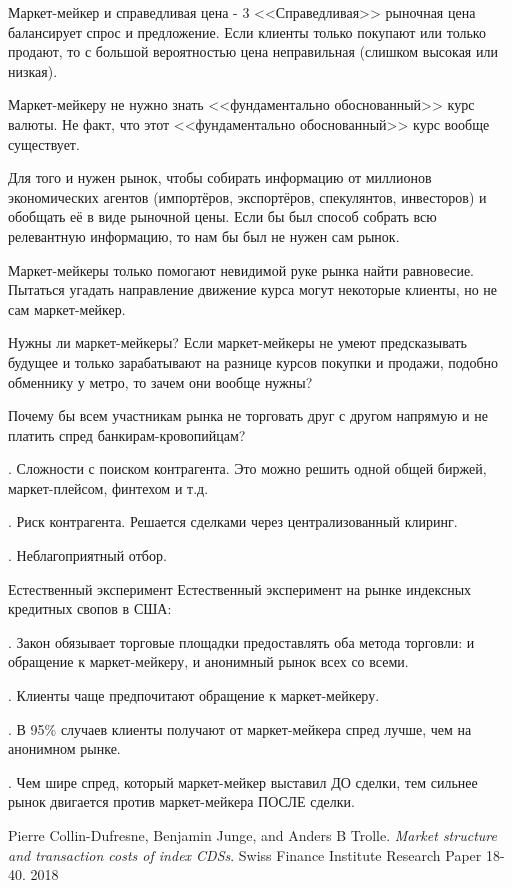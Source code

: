 \documentclass{beamer}
\begin{document}
\begin{frame}{Маркет-мейкер и справедливая цена - 3}
\justify
<<Справедливая>> рыночная цена балансирует спрос и предложение.
Если клиенты только покупают или только продают, то с большой вероятностью цена 
неправильная (слишком высокая или низкая).

\justify
Маркет-мейкеру не нужно знать <<фундаментально обоснованный>> курс валюты. Не факт, что этот <<фундаментально обоснованный>> курс вообще существует.

\justify
Для того и нужен рынок, чтобы собирать информацию от миллионов экономических 
агентов (импортёров, экспортёров, спекулянтов, инвесторов) и обобщать её в виде
рыночной цены. Если бы был способ собрать всю релевантную информацию, то нам бы
был не нужен сам рынок.

\justify
Маркет-мейкеры только помогают невидимой руке рынка найти равновесие. Пытаться 
угадать направление движение курса могут некоторые клиенты, но не сам маркет-мейкер.
\end{frame}



\begin{frame}{Нужны ли маркет-мейкеры?}
\justify
Если маркет-мейкеры не умеют предсказывать будущее и только зарабатывают на 
разнице курсов покупки и продажи, подобно обменнику у метро, то зачем они вообще 
нужны?

\justify
Почему бы всем участникам рынка не торговать друг с другом напрямую и не платить
спред банкирам-кровопийцам?

. Сложности с поиском контрагента. Это можно решить одной общей биржей,
маркет-плейсом, финтехом и т.д.

. Риск контрагента. Решается сделками через централизованный клиринг.

. Неблагоприятный отбор.
\end{frame}



\begin{frame}{Естественный эксперимент}
\justify
Естественный эксперимент на рынке индексных кредитных свопов в США:

. Закон обязывает торговые площадки предоставлять оба метода торговли: и обращение к маркет-мейкеру, и анонимный рынок всех со всеми.

. Клиенты чаще предпочитают обращение к маркет-мейкеру.

. В 95\% случаев клиенты получают от маркет-мейкера спред лучше, чем на анонимном рынке.

. Чем шире спред, который маркет-мейкер выставил ДО сделки, тем сильнее рынок двигается против маркет-мейкера ПОСЛЕ сделки.

\justify
\small{Pierre Collin-Dufresne, Benjamin Junge, and Anders B Trolle. \textit{Market structure and transaction costs of index CDSs}. Swiss Finance Institute Research Paper 18-40. 2018}
\end{frame}
\end{document}
